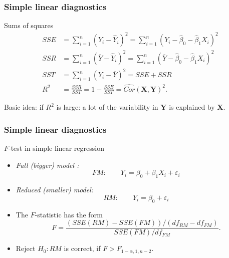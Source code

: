 \documentclass[handout]{beamer}
\begin{document}

   \begin{frame} \frametitle{Simple linear diagnostics}

   \begin{block}
   {Sums of squares}
   $$
   \begin{aligned}
   SSE &= \sum_{i=1}^n(Y_i - \widehat{Y}_i)^2 = \sum_{i=1}^n (Y_i - \widehat{\beta}_0 - \widehat{\beta}_1 X_i)^2 \\
   SSR &= \sum_{i=1}^n(\overline{Y} - \widehat{Y}_i)^2 = \sum_{i=1}^n (\overline{Y} - \widehat{\beta}_0 - \widehat{\beta}_1 X_i)^2 \\
   SST &= \sum_{i=1}^n(Y_i - \overline{Y})^2 = SSE + SSR \\
   R^2 &= \frac{SSR}{SST} = 1 - \frac{SSE}{SST} = \widehat{Cor}(\pmb{X},\pmb{Y})^2.
   \end{aligned}
   $$


   Basic idea: if $R^2$ is large: a lot  of the variability in $\pmb{Y}$ is explained by $\pmb{X}$.

   \end{block}
   \end{frame}


   \begin{frame} \frametitle{Simple linear diagnostics}

   \begin{block}
   {$F$-test in simple linear regression}
   \begin{itemize}
   \item {\em Full (bigger) model :}
   $$
   FM: \qquad Y_i = \beta_0 + \beta_1 X_i + \varepsilon_i$$
   \item {\em Reduced (smaller) model:}
   $$
   RM: \qquad Y_i = \beta_0  + \varepsilon_i$$

   \item The $F$-statistic has the form
   $$
   F=\frac{(SSE(RM) - SSE(FM)) / (df_{RM} - df_{FM})}{SSE(FM) / df_{FM}}.$$
   \item Reject $H_0: RM$ is correct, if $F > F_{1-\alpha, 1, n-2}$.

   \end{itemize}
   \end{block}
   \end{frame}

\end{document}
